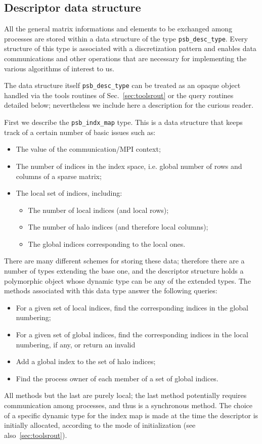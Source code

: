\subsection{Descriptor data structure}
\label{sec:desc}
All the general matrix informations and elements to be
exchanged among processes are stored within a data structure of the
type \hypertarget{descdata}{{\tt psb\_desc\_type}}. 
Every structure of this type is associated with a discretization
pattern and enables data communications and other operations that are
necessary for implementing the various algorithms of interest to us. 

The data structure itself \verb|psb_desc_type| can be treated as an
opaque object handled via the   tools routines of
Sec.~\ref{sec:toolsrout} or the query routines detailed below;
nevertheless we include here a  description for the curious 
reader. 

First we describe the \verb|psb_indx_map| type. This is a data
structure that keeps track of a certain number of basic issues such
as:
\begin{itemize}
\item The value of the communication/MPI context;
\item The number of indices in the index space, i.e. global number of
  rows and columns of a sparse matrix;
\item The local set of indices, including:
\begin{itemize}
\item The number of local indices (and local rows);
\item The number of halo indices (and therefore local columns); 
\item The global indices corresponding to the local ones. 
\end{itemize}
\end{itemize}
There are many different schemes for storing these data; therefore
there are a number of types extending the base one, and the descriptor
structure holds a polymorphic object whose dynamic type can be any of
the extended  types. 
The methods associated with this data type answer the following
queries:
\begin{itemize}
\item For a given set of local indices, find the corresponding indices
  in the global numbering;
\item For a given set of global indices, find the corresponding
  indices in the local numbering, if any, or return an invalid 
\item Add a global index to the set of halo indices;
\item Find the process  owner of each member of a set of global
  indices.
\end{itemize}
All methods but the last are purely local; the last method potentially
requires communication among processes, and thus is a synchronous
method. The choice of a specific dynamic type for the index map is
made at the time the descriptor is initially allocated, according to
the mode of initialization (see also~\ref{sec:toolsrout}).

